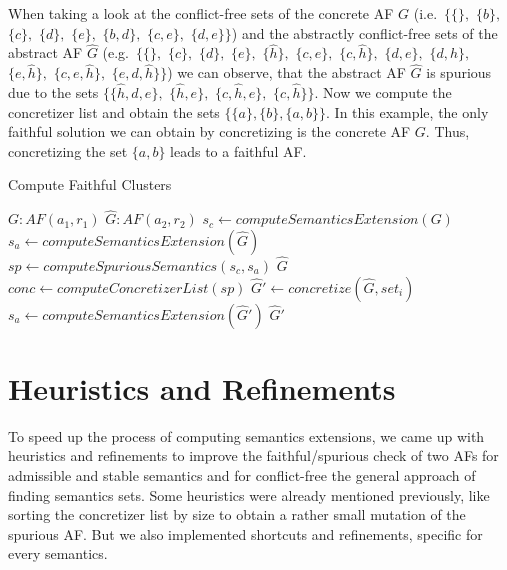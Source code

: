 When taking a look at the conflict-free sets of the concrete AF $G$ (i.e.\ $\bigl\{ \{\},$ $\{b\},$ $\{c\},$ $\{d\},$ $\{e\},$ $\{b, d\},$  $\{c, e\},$ $\{d, e\} \bigl\}$) and the abstractly conflict-free sets of the abstract AF $\hat{G}$ (e.g.\ $\bigl\{ \{\},$ $\{c\},$ $\{d\},$ $\{e\},$ $\{\hat{h}\},$ $\{c, e\},$ $\{c, \hat{h}\},$ $\{d, e\},$ $\{d, \hat{h}\},$ $\{e, \hat{h}\},$ $\{c, e, \hat{h}\},$ $\{e, d, \hat{h}\} \bigl\}$) we can observe, that the abstract AF $\hat{G}$ is spurious due to the sets $\bigl\{\{\hat{h}, d, e\},$ $\{\hat{h}, e\},$ $\{c, \hat{h}, e\},$ $\{c, \hat{h}\}\bigl\}$. Now we compute the concretizer list and obtain the sets $\bigl\{ \{a\}, \{b\}, \{a, b\}\bigl\}$. In this example, the only faithful solution we can obtain by concretizing is the concrete AF $G$. Thus, concretizing the set $\{a, b\}$ leads to a faithful AF.
\vspace{0.5cm}

\begin{algorithm}
    \caption{Compute Faithful Clusters}\label{alg:computeFaithfulClusters}
    \begin{algorithmic}[1]
        \Require $G: AF(a_1, r_1)$ 
        \Require $\hat{G}: AF(a_2, r_2)$ 
        \State $s_c \gets computeSemanticsExtension(G)$
        \State $s_a \gets computeSemanticsExtension(\hat{G})$
        \State $sp \gets computeSpuriousSemantics(s_c, s_a)$
            \State \Return $\hat{G}$
        \EndIf
        \State $conc \gets computeConcretizerList(sp)$
            \State $\hat{G}' \gets concretize(\hat{G}, set_i)$
            \State $s_a \gets computeSemanticsExtension(\hat{G}')$
                \State \Return $\hat{G}'$
            \EndIf
        \EndFor
    \end{algorithmic}
\end{algorithm}



\newpage
\section{Heuristics and Refinements}
\label{sec:HeuristicsAndRefinements}

To speed up the process of computing semantics extensions, we came up with heuristics and refinements to improve the faithful/spurious check of two AFs for admissible and stable semantics and for conflict-free the general approach of finding semantics sets. Some heuristics were already mentioned previously, like sorting the concretizer list by size to obtain a rather small mutation of the spurious AF. But we also implemented shortcuts and refinements, specific for every semantics.

